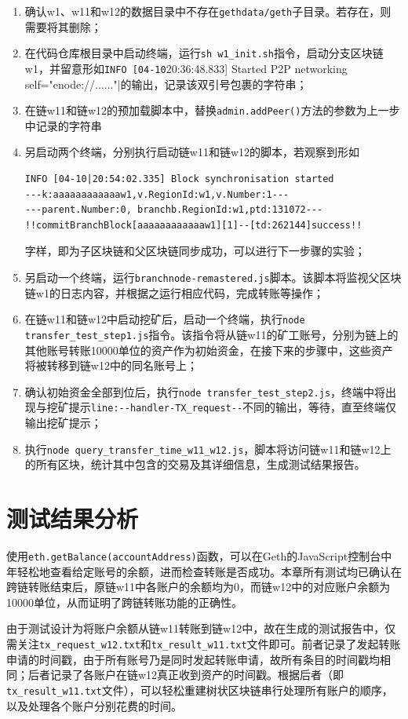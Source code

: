 \begin{enumerate}
    \item 确认w1、w11和w12的数据目录中不存在\verb|gethdata/geth|子目录。若存在，则需要将其删除；
    \item 在代码仓库根目录中启动终端，运行\verb|sh w1_init.sh|指令，启动分支区块链w1，并留意形如\verb|INFO [04-10|20:36:48.833] Started P2P networking self="enode://......"|的输出，记录该双引号包裹的字符串；
    \item 在链w11和链w12的预加载脚本中，替换\verb|admin.addPeer()|方法的参数为上一步中记录的字符串
    \item 另启动两个终端，分别执行启动链w11和链w12的脚本，若观察到形如\begin{verbatim}
INFO [04-10|20:54:02.335] Block synchronisation started
---k:aaaaaaaaaaaaw1,v.RegionId:w1,v.Number:1---
---parent.Number:0, branchb.RegionId:w1,ptd:131072---
!!commitBranchBlock[aaaaaaaaaaaaw1][1]--[td:262144]success!!
    \end{verbatim}
          字样，即为子区块链和父区块链同步成功，可以进行下一步骤的实验；
    \item 另启动一个终端，运行\verb|branchnode-remastered.js|脚本。该脚本将监视父区块链w1的日志内容，并根据之运行相应代码，完成转账等操作；
    \item 在链w11和链w12中启动挖矿后，启动一个终端，执行\verb|node transfer_test_step1.js|指令。该指令将从链w11的矿工账号，分别为链上的其他账号转账10000单位的资产作为初始资金，在接下来的步骤中，这些资产将被转移到链w12中的同名账号上；
    \item 确认初始资金全部到位后，执行\verb|node transfer_test_step2.js|，终端中将出现与挖矿提示\verb|line:--handler-TX_request--|不同的输出，等待，直至终端仅输出挖矿提示；
    \item 执行\verb|node query_transfer_time_w11_w12.js|，脚本将访问链w11和链w12上的所有区块，统计其中包含的交易及其详细信息，生成测试结果报告。
\end{enumerate}

\section{测试结果分析}

使用\verb|eth.getBalance(accountAddress)|函数，可以在Geth的JavaScript控制台中年轻松地查看给定账号的余额，进而检查转账是否成功。本章所有测试均已确认在跨链转账结束后，原链w11中各账户的余额均为0，而链w12中的对应账户余额为10000单位，从而证明了跨链转账功能的正确性。

由于测试设计为将账户余额从链w11转账到链w12中，故在生成的测试报告中，仅需关注\verb|tx_request_w12.txt|和\verb|tx_result_w11.txt|文件即可。前者记录了发起转账申请的时间戳，由于所有账号乃是同时发起转账申请，故所有条目的时间戳均相同；后者记录了各账户在链w12真正收到资产的时间戳。根据后者（即\verb|tx_result_w11.txt|文件），可以轻松重建树状区块链串行处理所有账户的顺序，以及处理各个账户分别花费的时间。

